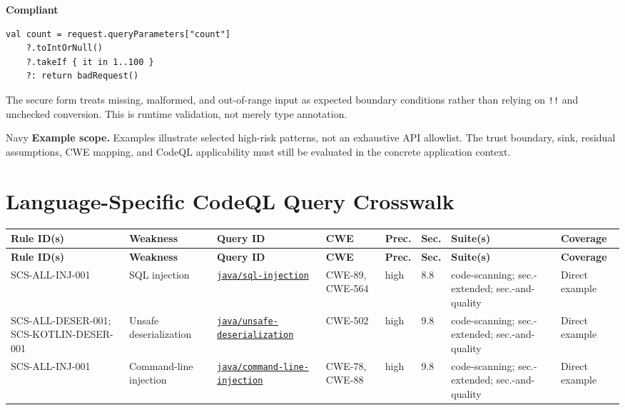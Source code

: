 \documentclass[10pt,letterpaper]{article}
\newcommand{\code}[1]{\texttt{\small #1}}
\begin{document}
\textbf{Compliant}\par
\begin{lstlisting}
val count = request.queryParameters["count"]
    ?.toIntOrNull()
    ?.takeIf { it in 1..100 }
    ?: return badRequest()
\end{lstlisting}

The secure form treats missing, malformed, and out-of-range input as expected boundary conditions rather than relying on \code{!!} and unchecked conversion. This is runtime validation, not merely type annotation.\par
\begin{callout}{Navy}
\textbf{Example scope.} Examples illustrate selected high-risk patterns, not an exhaustive API allowlist. The trust boundary, sink, residual assumptions, CWE mapping, and CodeQL applicability must still be evaluated in the concrete application context.
\end{callout}
\section{Language-Specific CodeQL Query Crosswalk}\begin{landscape}\scriptsize
\setlength{\tabcolsep}{2.6pt}
\begin{longtable}{@{}P{1.50in}P{1.12in}P{2.05in}P{0.78in}P{0.52in}P{0.48in}P{1.45in}P{0.82in}@{}}
\toprule
\textbf{Rule ID(s)} & \textbf{Weakness} & \textbf{Query ID} & \textbf{CWE} & \textbf{Prec.} & \textbf{Sec.} & \textbf{Suite(s)} & \textbf{Coverage}\\
\midrule
\endfirsthead
\toprule
\textbf{Rule ID(s)} & \textbf{Weakness} & \textbf{Query ID} & \textbf{CWE} & \textbf{Prec.} & \textbf{Sec.} & \textbf{Suite(s)} & \textbf{Coverage}\\
\midrule
\endhead
SCS-ALL-INJ-001 & SQL injection & \href{https://codeql.github.com/codeql-query-help/java/java-sql-injection/}{\nolinkurl{java/sql-injection}} & CWE-89, CWE-564 & high & 8.8 & code-scanning; sec.-extended; sec.-and-quality & Direct example\\
SCS-ALL-DESER-001; SCS-KOTLIN-DESER-001 & Unsafe deserialization & \href{https://codeql.github.com/codeql-query-help/java/java-unsafe-deserialization/}{\nolinkurl{java/unsafe-deserialization}} & CWE-502 & high & 9.8 & code-scanning; sec.-extended; sec.-and-quality & Direct example\\
SCS-ALL-INJ-001 & Command-line injection & \href{https://codeql.github.com/codeql-query-help/java/java-command-line-injection/}{\nolinkurl{java/command-line-injection}} & CWE-78, CWE-88 & high & 9.8 & code-scanning; sec.-extended; sec.-and-quality & Direct example\\
\bottomrule
\end{longtable}
\normalsize\end{landscape}
\end{document}
